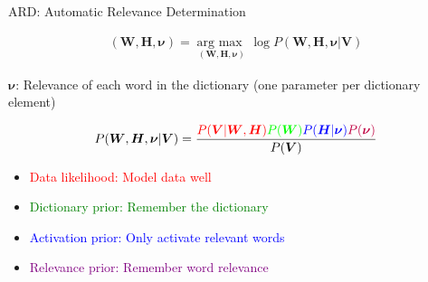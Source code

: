 \documentclass[a0,sans]{esatposter}
\newcommand{\bs}[1]{\boldsymbol{#1}}
\begin{document}
{
	{%
		\Large{ARD: Automatic Relevance Determination}
		\vspace{1cm}
		
		
		\vspace{1cm}
		
		
		\begin{minipage}{\linewidth}
			\Large
			\begin{align}
				(\bs{W}, \bs{H}, \bs{\nu}) = \underset{(\bs{W}, \bs{H}, \bs{\nu})}{\operatorname{arg\ max\ }} \log P(\bs{W}, \bs{H}, \bs{\nu}\vert\bs{V}) \nonumber
			\end{align}
			
			\vspace{1cm}
			
			$\bs{\nu}$: Relevance of each word in the dictionary (one parameter per dictionary element)
			
			\begin{align}
				P(\bs{W}, \bs{H}, \bs{\nu}\vert\bs{V}) = \frac{\textcolor{red}{P(\bs{V} \vert \bs{W}, \bs{H})}\textcolor{green}{P(\bs{W})}\textcolor{blue}{P(\bs{H} \vert \bs{\nu})}\textcolor{purple}{P(\bs{\nu})}}{P(\bs{V})} \nonumber
			\end{align}
		\end{minipage}
		
		\Large{
			\begin{itemize}
				\item \textcolor{red}{Data likelihood: Model data well}
				\item \textcolor{green}{Dictionary prior: Remember the dictionary}
				\item \textcolor{blue}{Activation prior: Only activate relevant words}
				\item \textcolor{purple}{Relevance prior: Remember word relevance}
			\end{itemize}	
		}
	
}}
\end{document}

